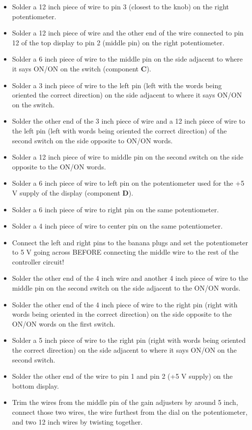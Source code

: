 \documentclass[10pt,letterpaper]{article}
\begin{document}
\begin{itemize}
    \item Solder a 12 inch piece of wire to pin 3 (closest to the knob) on the right potentiometer.
    \item Solder a 12 inch piece of wire and the other end of the wire connected to pin 12 of the top display to pin 2 (middle pin) on the right potentiometer.
    \item Solder a 6 inch piece of wire to the middle pin on the side adjacent to where it says ON/ON on the switch (component \textbf{C}).
    \item Solder a 3 inch piece of wire to the left pin (left with the words being oriented the correct direction) on the side adjacent to where it says ON/ON on the switch.
    \item Solder the other end of the 3 inch piece of wire and a 12 inch piece of wire to the left pin (left with words being oriented the correct direction) of the second switch on the side opposite to ON/ON words.
    \item Solder a 12 inch piece of wire to middle pin on the second switch on the side opposite to the ON/ON words.
    \item Solder a 6 inch piece of wire to left pin on the potentiometer used for the  +5 V supply of the display (component \textbf{D}).
    \item Solder a 6 inch piece of wire to right pin on the same potentiometer.
    \item Solder a 4 inch piece of wire to center pin on the same potentiometer. 
    \item Connect the left and right pins to the banana plugs and set the potentiometer to 5 V going across BEFORE connecting the middle wire to the rest of the controller circuit! 
    \item Solder the other end of the 4 inch wire and another 4 inch piece of wire to the middle pin on the second switch on the side adjacent to the ON/ON words.
    \item Solder the other end of the 4 inch piece of wire to the right pin (right with words being oriented in the correct direction) on the side opposite to the ON/ON words on the first switch.
    \item Solder a 5 inch piece of wire to the right pin (right with words being oriented the correct direction) on the side adjacent to where it says ON/ON on the second switch.
    \item Solder the other end of the wire to pin 1 and pin 2 (+5 V supply) on the bottom display.
    \item Trim the wires from the middle pin of the gain adjusters by around 5 inch, connect those two wires, the wire furthest from the dial on the potentiometer, and two 12 inch wires by twisting together.

\end{itemize}
\end{document}
